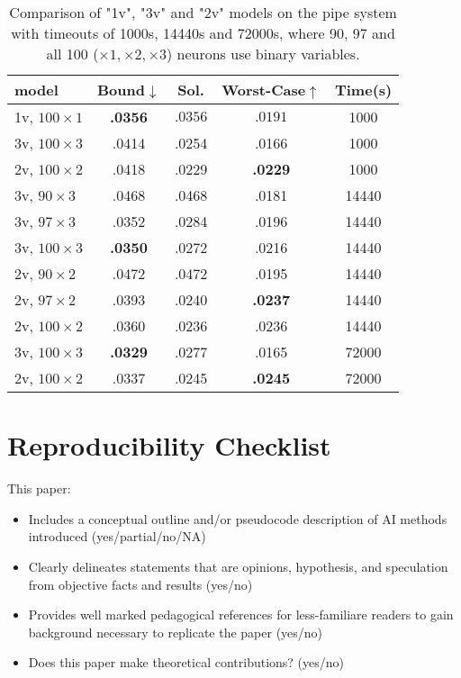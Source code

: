 	\begin{table}[h!]
	\begin{tabular}{||l||c|c|c|c||}\hline\hline
		model &        Bound$\downarrow$ &  Sol. &      Worst-Case$\uparrow$ &  Time(s) \\\hline \hline
		1v, $100 \times 1$ &     {\bf .0356} &  $.0356$ & $.0191$ &  1000 \\\hline
		3v, $100 \times 3$&     .0414 &  .0254 &  .0166 &  1000 \\\hline
		2v, $100 \times 2$&     .0418 &  .0229 &   {\bf .0229} &  1000 \\\hline \hline
		
	    3v, $90 \times 3$&     .0468 &  .0468 &  .0181 & 14440 \\\hline	
		3v, $97 \times 3$&     .0352 &  .0284 &  .0196 & 14440 \\\hline
		3v, $100 \times 3$&      {\bf .0350} &  .0272 &  .0216 & 14440 \\\hline

		2v, $90 \times 2$&     .0472 &  .0472 &  .0195 & 14440 \\\hline	
		2v, $97 \times 2$&     .0393 &  .0240 &   {\bf .0237} & 14440 \\\hline
		2v, $100 \times 2$&     .0360 &  .0236 &   .0236 & 14440 \\\hline \hline

		3v, $100 \times 3$&     {\bf .0329} &  .0277 &  .0165 & 72000 \\\hline
		2v, $100 \times 2$&     .0337 &  .0245 &  {\bf .0245} & 72000 \\\hline\hline
	\end{tabular}
	\caption{Comparison of "1v", "3v" and "2v" models on the pipe system with timeouts of 1000s, 14440s and 72000s, where 90, 97 and all 100 ($\times 1, \times 2,\times 3$) neurons use binary variables.}
	\label{table.pipe}
\end{table}


\section{Reproducibility Checklist}

This paper:
\begin{itemize}
\item Includes a conceptual outline and/or pseudocode description of AI methods introduced (yes/partial/no/NA)
\item Clearly delineates statements that are opinions, hypothesis, and speculation from objective facts and results (yes/no)
\item Provides well marked pedagogical references for less-familiare readers to gain background necessary to replicate the paper (yes/no)
\item Does this paper make theoretical contributions? (yes/no)
\end{itemize}

